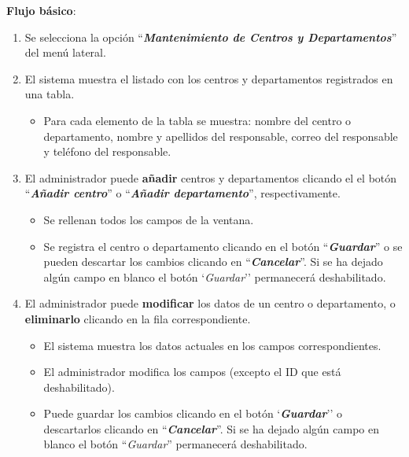 \textbf{Flujo básico}:
    \begin{enumerate}
        \item Se selecciona la opción ``\textbf{\textit{Mantenimiento de Centros y Departamentos}}'' del menú lateral.
        
        \item El sistema muestra el listado con los centros y departamentos registrados en una tabla.
            \begin{itemize}
                \item Para cada elemento de la tabla se muestra: nombre del centro o departamento, nombre y apellidos del responsable, correo del responsable y teléfono del responsable.
            \end{itemize}
            
        \item El administrador puede \textbf{añadir} centros y departamentos clicando el el botón ``\textbf{\textit{Añadir centro}}'' o ``\textbf{\textit{Añadir departamento}}'', respectivamente.
            \begin{itemize}
            \tightlist
                \item Se rellenan todos los campos de la ventana.
                
                \item Se registra el centro o departamento clicando en el botón ``\textbf{\textit{Guardar}}'' o se pueden descartar los cambios clicando en ``\textbf{\textit{Cancelar}}''. Si se ha dejado algún campo en blanco el botón `\textit{Guardar}'' permanecerá deshabilitado.
            \end{itemize}
            
        \item El administrador puede \textbf{modificar} los datos de un centro o departamento, o  \textbf{eliminarlo} clicando en la fila correspondiente.
            \begin{itemize}
            \tightlist
                \item El sistema muestra los datos actuales en los campos correspondientes.
                
                \item El administrador modifica los campos (excepto el ID que está deshabilitado).
                
            \item Puede guardar los cambios clicando en el botón `\textbf{\textit{Guardar}}'' o descartarlos clicando en ``\textbf{\textit{Cancelar}}''. Si se ha dejado algún campo en blanco el botón ``\textit{Guardar}'' permanecerá deshabilitado.
                

\end{itemize}
\end{enumerate}
